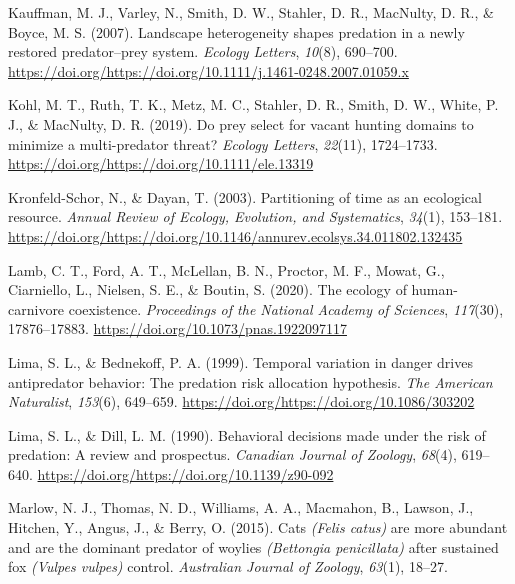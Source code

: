 \documentclass[]{elsarticle} %
\begin{document}
\leavevmode\hypertarget{ref-kauffman2007landscape}{}%
Kauffman, M. J., Varley, N., Smith, D. W., Stahler, D. R., MacNulty, D. R., \& Boyce, M. S. (2007). Landscape heterogeneity shapes predation in a newly restored predator--prey system. \emph{Ecology Letters}, \emph{10}(8), 690--700. \url{https://doi.org/https://doi.org/10.1111/j.1461-0248.2007.01059.x}

\leavevmode\hypertarget{ref-kohl2019prey}{}%
Kohl, M. T., Ruth, T. K., Metz, M. C., Stahler, D. R., Smith, D. W., White, P. J., \& MacNulty, D. R. (2019). Do prey select for vacant hunting domains to minimize a multi-predator threat? \emph{Ecology Letters}, \emph{22}(11), 1724--1733. \url{https://doi.org/https://doi.org/10.1111/ele.13319}

\leavevmode\hypertarget{ref-kronfeld2003partitioning}{}%
Kronfeld-Schor, N., \& Dayan, T. (2003). Partitioning of time as an ecological resource. \emph{Annual Review of Ecology, Evolution, and Systematics}, \emph{34}(1), 153--181. \url{https://doi.org/https://doi.org/10.1146/annurev.ecolsys.34.011802.132435}

\leavevmode\hypertarget{ref-lamb2020ecology}{}%
Lamb, C. T., Ford, A. T., McLellan, B. N., Proctor, M. F., Mowat, G., Ciarniello, L., Nielsen, S. E., \& Boutin, S. (2020). The ecology of human-carnivore coexistence. \emph{Proceedings of the National Academy of Sciences}, \emph{117}(30), 17876--17883. \url{https://doi.org/10.1073/pnas.1922097117}

\leavevmode\hypertarget{ref-lima1999temporal}{}%
Lima, S. L., \& Bednekoff, P. A. (1999). Temporal variation in danger drives antipredator behavior: The predation risk allocation hypothesis. \emph{The American Naturalist}, \emph{153}(6), 649--659. \url{https://doi.org/https://doi.org/10.1086/303202}

\leavevmode\hypertarget{ref-lima1990behavioral}{}%
Lima, S. L., \& Dill, L. M. (1990). Behavioral decisions made under the risk of predation: A review and prospectus. \emph{Canadian Journal of Zoology}, \emph{68}(4), 619--640. \url{https://doi.org/https://doi.org/10.1139/z90-092}

\leavevmode\hypertarget{ref-marlow2015cats}{}%
Marlow, N. J., Thomas, N. D., Williams, A. A., Macmahon, B., Lawson, J., Hitchen, Y., Angus, J., \& Berry, O. (2015). Cats \emph{(Felis catus)} are more abundant and are the dominant predator of woylies \emph{(Bettongia penicillata)} after sustained fox \emph{(Vulpes vulpes)} control. \emph{Australian Journal of Zoology}, \emph{63}(1), 18--27.
\end{document}
